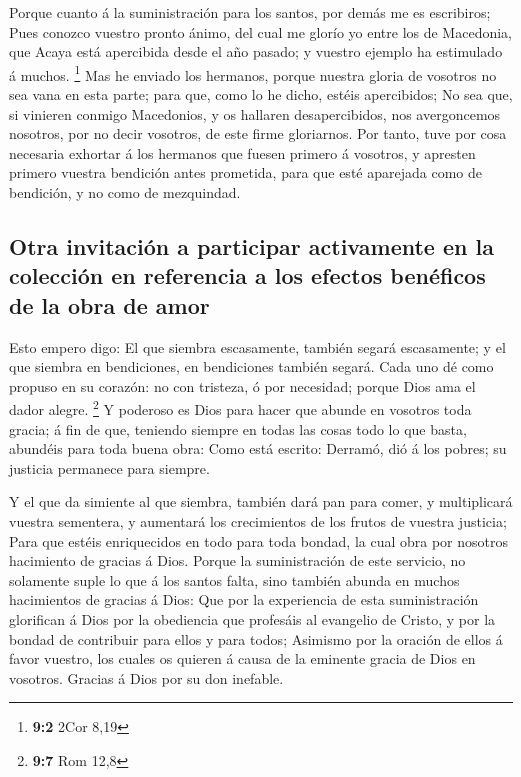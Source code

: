  Porque cuanto á la suministración para los santos, por
demás me es escribiros;  Pues conozco vuestro pronto ánimo,
del cual me glorío yo entre los de Macedonia, que Acaya está apercibida
desde el año pasado; y vuestro ejemplo ha estimulado á muchos.
\footnote{\textbf{9:2} 2Cor 8,19}  Mas he enviado los
hermanos, porque nuestra gloria de vosotros no sea vana en esta parte;
para que, como lo he dicho, estéis apercibidos;  No sea que,
si vinieren conmigo Macedonios, y os hallaren desapercibidos, nos
avergoncemos nosotros, por no decir vosotros, de este firme gloriarnos.
 Por tanto, tuve por cosa necesaria exhortar á los hermanos
que fuesen primero á vosotros, y apresten primero vuestra bendición
antes prometida, para que esté aparejada como de bendición, y no como de
mezquindad.

\hypertarget{otra-invitaciuxf3n-a-participar-activamente-en-la-colecciuxf3n-en-referencia-a-los-efectos-benuxe9ficos-de-la-obra-de-amor}{%
\subsection{Otra invitación a participar activamente en la colección en
referencia a los efectos benéficos de la obra de
amor}\label{otra-invitaciuxf3n-a-participar-activamente-en-la-colecciuxf3n-en-referencia-a-los-efectos-benuxe9ficos-de-la-obra-de-amor}}

 Esto empero digo: El que siembra escasamente, también
segará escasamente; y el que siembra en bendiciones, en bendiciones
también segará.  Cada uno dé como propuso en su corazón: no
con tristeza, ó por necesidad; porque Dios ama el dador alegre.
\footnote{\textbf{9:7} Rom 12,8}  Y poderoso es Dios para
hacer que abunde en vosotros toda gracia; á fin de que, teniendo siempre
en todas las cosas todo lo que basta, abundéis para toda buena obra:
 Como está escrito: Derramó, dió á los pobres; su justicia
permanece para siempre.

 Y el que da simiente al que siembra, también dará pan para
comer, y multiplicará vuestra sementera, y aumentará los crecimientos de
los frutos de vuestra justicia;  Para que estéis
enriquecidos en todo para toda bondad, la cual obra por nosotros
hacimiento de gracias á Dios.  Porque la suministración de
este servicio, no solamente suple lo que á los santos falta, sino
también abunda en muchos hacimientos de gracias á Dios: 
Que por la experiencia de esta suministración glorifican á Dios por la
obediencia que profesáis al evangelio de Cristo, y por la bondad de
contribuir para ellos y para todos;  Asimismo por la
oración de ellos á favor vuestro, los cuales os quieren á causa de la
eminente gracia de Dios en vosotros.  Gracias á Dios por su
don inefable.

